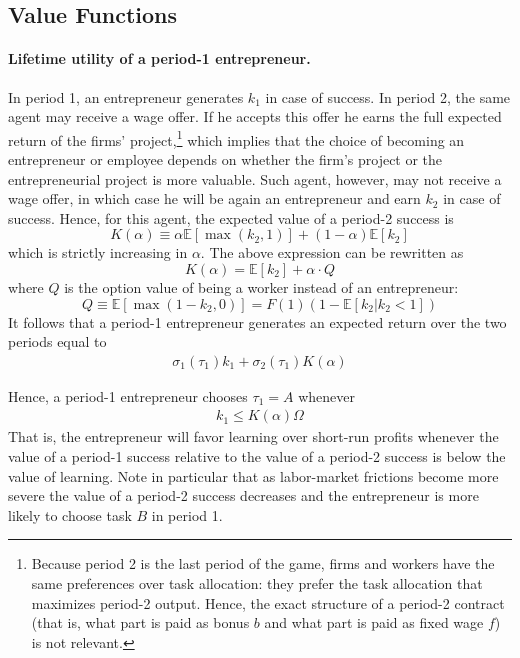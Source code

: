 \documentclass[12pt,american]{paper}
\theoremstyle{remark}
\newcommand{\E}[1]{\mathbb E[#1]}
\begin{document}
 
\subsection{Value Functions}
 

\paragraph{Lifetime utility of a period-1 entrepreneur.}
In period 1, an entrepreneur generates $k_1$ in case of success. In period 2, the same agent may receive a wage offer.  If he accepts this offer he earns the full expected return of the firms' project,\footnote{Because period 2 is the last period of the game, firms and workers have the same preferences over task allocation: they prefer the task allocation that maximizes period-2 output. Hence, the exact structure of a period-2 contract (that is, what part is paid as bonus $b$ and what part is paid as fixed wage $f$) is not relevant. } which implies that the choice of becoming an entrepreneur or employee depends on whether the firm's project   or the entrepreneurial project  is more valuable. Such agent, however, may not receive a wage offer, in which case  he will be again an entrepreneur and earn $k_2$ in case of success. Hence, for this agent, the expected value of a period-2 success is
\[
K(\alpha) \equiv \alpha \E{\max(k_2,1)}+(1-\alpha) \E{k_2} 
\]
which is strictly increasing in $\alpha$. The above expression can be rewritten as 
\[
K(\alpha)=\E{k_2}+\alpha \cdot Q
\]
where $Q$ is the option value of being a worker instead of an entrepreneur:
\[
Q \equiv \E{\max(1-k_2,0)}=F(1)(1-\E{k_2|k_2<1})
\]
It follows that a period-1 entrepreneur generates an expected return over the two periods equal to
\begin{align*} 
\sigma_1(\tau_1) k_1+ \sigma_2(\tau_1) K(\alpha)
\end{align*}

Hence, a period-1 entrepreneur chooses $\tau_1=A$ whenever
\begin{align}\label{eq: optimal entrepreneur}
k_1 \leq  K(\alpha) \Omega
\end{align}
That is, the entrepreneur will favor learning over short-run profits whenever the value of a period-1 success relative to the value of a period-2 success is below the value of learning. Note in particular that  as labor-market frictions become more severe the value of a period-2 success decreases and the entrepreneur is more likely to choose task $B$ in period 1.  
\end{document}
